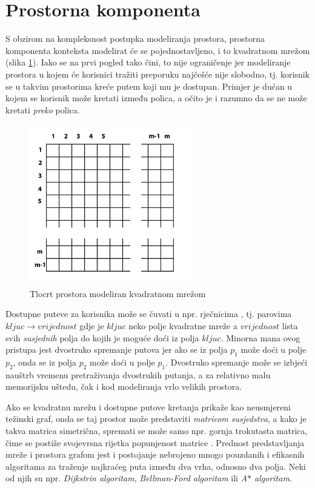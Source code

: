 \documentclass[times, utf8, diplomski, numeric]{fer}
\begin{document}
\section{Prostorna komponenta}

S obzirom na kompleksnost postupka modeliranja prostora, prostorna komponenta
konteksta modelirat će se pojednostavljeno, i to kvadratnom mrežom
(slika \ref{fig:StoreGrid}). Iako se na prvi pogled tako čini, to nije
ograničenje jer modeliranje prostora u kojem će korisnici tražiti preporuku
najčešće nije slobodno, tj. korisnik se u takvim prostorima kreće putem koji mu
je dostupan. Primjer je dućan u kojem se korisnik može kretati između polica, a
očito je i razumno da se ne može kretati \emph{preko} polica.

\begin{figure}[H]
	\centering
	\includegraphics[width=7cm]{images/grid.png}
	\caption{Tlocrt prostora modeliran kvadratnom mrežom}
	\label{fig:StoreGrid}
\end{figure}

Dostupne puteve za korisnika može se čuvati u npr. rječnicima
, tj. parovima $kljuc \rightarrow vrijednost$ gdje je $kljuc$
neko polje kvadratne mreže a $vrijednost$ lista svih \emph{susjednih} polja do
kojih je moguće doći iz polja $kljuc$. Minorna mana ovog pristupa jest
dvostruko spremanje putova jer ako se iz polja $p_1$ može doći u polje $p_2$,
onda se iz polja $p_2$ može doći u polje $p_1$. Dvostruko spremanje može se
izbjeći nauštrb vremenu pretraživanja dvostrukih putanja, a za relativno malu
memorijsku uštedu, čak i kod modeliranja vrlo velikih prostora.

Ako se kvadratnu mrežu i dostupne putove kretanja prikaže kao neusmjereni
težinski graf, onda se taj prostor može predstaviti \emph{matricom
susjedstva}, a kako je takva matrica simetrična, spremati se može samo npr.
gornja trokutasta matrica, čime se postiže svojevrsna rijetka popunjenost
matrice .
Prednost predstavljanja mreže i prostora grafom jest i postojanje nebrojeno
mnogo pouzdanih i efikasnih algoritama za traženje najkraćeg puta između dva
vrha, odnosno dva polja. Neki od njih su npr. \emph{Dijkstrin algoritam},
\emph{Bellman-Ford algoritam} ili \emph{A$\ast$ algoritam}.
\end{document}
